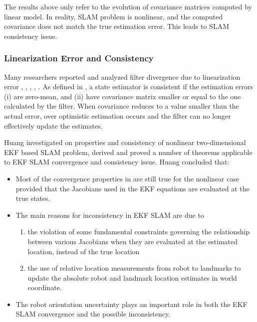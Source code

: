 The results above only refer to the evolution of covariance matrices
computed by linear model. In reality, SLAM problem is nonlinear, and
the computed covariance does not match the true estimation error. This
leads to SLAM consistency issue.

\subsubsection{Linearization Error and Consistency}
Many researchers reported and analyzed filter divergence due to
linearization error \cite{martinelli_results_2005},
\cite{julier_counter_2001}, \cite{bailey_consistency_2006},
\cite{frese_discussion_2006}, \cite{castellanos_limits_2004}. As
defined in \cite{huang_analysis_2008}, a state estimator is consistent
if the estimation errors (i) are zero-mean, and (ii) have covariance
matrix smaller or equal to the one calculated by the filter. When
covariance reduces to a value smaller than the actual error, over
optimistic estimation occurs and the filter can no longer effectively
update the estimates.

Huang investigated \cite{huang_convergence_2007} on properties and
consistency of nonlinear two-dimensional EKF based SLAM problem,
derived and proved a number of theorems applicable to EKF SLAM
convergence and consistency issue. Huang concluded that:

\begin{itemize}
  \item Most of the convergence properties in
  \cite{dissanayake_solution_2001} are still true for the nonlinear
  case provided that the Jacobians used in the EKF equations are
  evaluated at the true states.
  \item The main reasons for inconsistency in EKF SLAM are due to 
  \begin{enumerate}
    \item the violation of some fundamental constraints governing the
    relationship between various Jacobians when they are evaluated at
    the estimated location, instead of the true location
    \item the use of relative location measurements from robot to
    landmarks to update the absolute robot and landmark location
    estimates in world coordinate.
  \end{enumerate}
  \item The robot orientation uncertainty plays an important role in
  both the EKF SLAM convergence and the possible inconsistency.
\end{itemize}


